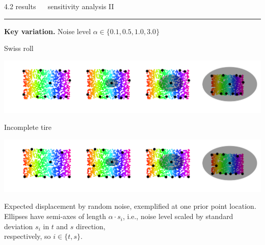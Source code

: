 \documentclass[11pt, compress, t, notes = noshow, xcolor = table, 
aspectratio = 1610]{beamer}
\begin{document}
\LARGE
\begin{frame}{\textcolor{gray!90}{4.2 results} ~~ sensitivity analysis II}
\normalsize
\vspace{-0.5cm}
\noindent \textcolor{gray!90}{\rule{\textwidth}{1pt}}
\smallskip

\textbf{Key variation.} Noise level $\alpha \in \{0.1, 0.5, 1.0, 3.0\}$ 

\vspace{0.3cm}

\begin{minipage}[c]{0.2\textwidth}
  Swiss roll
\end{minipage}%
\begin{minipage}[c]{0.8\textwidth}
  \includegraphics[trim = 40 30 0 0, clip, %
    width = \textwidth]{figures/sensitivity_noise_key_swiss}
\end{minipage}

\vspace{0.3cm}   

\begin{minipage}[c]{0.2\textwidth}
  Incomplete tire
\end{minipage}%
\begin{minipage}[c]{0.8\textwidth}
  \includegraphics[trim = 40 30 0 0, clip, %
    width = \textwidth]{figures/sensitivity_noise_key_tire}
\end{minipage}

\vfill

\scriptsize
Expected displacement by random noise, exemplified at one prior point location. 
\\
Ellipses have semi-axes of length $\alpha \cdot s_i$, i.e., noise level scaled 
by standard deviation $s_i$ in $t$ and $s$ direction, \\respectively, so
$i \in \{t, s\}$.

\end{frame}
\end{document}
